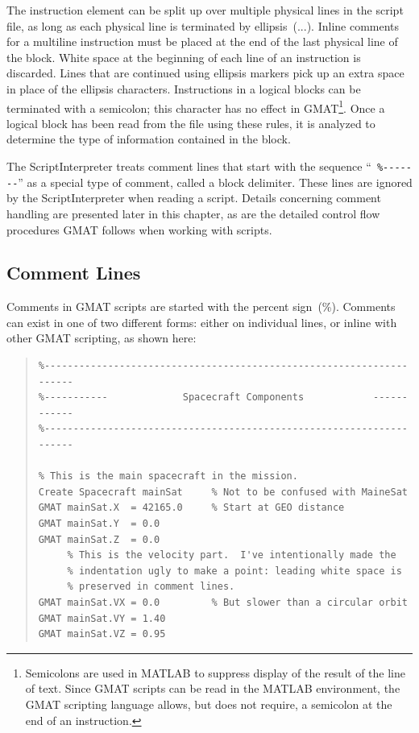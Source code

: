 The instruction element can be split up over multiple physical lines in the script file, as long as
each physical line is terminated by ellipsis~(...).  Inline comments for a multiline instruction
must be placed at the end of the last physical line of the block.  White space at the beginning
of each line of an instruction is discarded.  Lines that are continued using ellipsis markers pick
up an extra space in place of the ellipsis characters.  Instructions in a logical blocks can be
terminated with a semicolon; this character has no effect in GMAT\footnote{Semicolons are used in
MATLAB to suppress display of the result of the line of text.  Since GMAT scripts can be read in the
MATLAB environment, the GMAT scripting language allows, but does not require, a semicolon at the end
of an instruction.}.  Once a logical block has been read from the file using these rules, it is
analyzed to determine the type of information contained in the block.

The ScriptInterpreter treats comment lines that start with the sequence ``\texttt{
\%\nobreakdash-\nobreakdash-\nobreakdash-\nobreakdash-\nobreakdash-\nobreakdash-\nobreakdash-}''  as
a special type of comment, called a block delimiter. These lines are ignored by the
ScriptInterpreter when reading a script.  Details concerning comment handling are presented later
in this chapter, as are the detailed control flow procedures GMAT follows when working with scripts.

\subsection{\label{section:ScriptComments}Comment Lines}

Comments in GMAT scripts are started with the percent sign~(\%).  Comments can exist in one of two
different forms: either on individual lines, or inline with other GMAT scripting, as shown here:

\begin{quote}
\linenumbers[1]
\begin{verbatim}
%---------------------------------------------------------------------
%-----------             Spacecraft Components            ------------
%---------------------------------------------------------------------

% This is the main spacecraft in the mission.
Create Spacecraft mainSat     % Not to be confused with MaineSat
GMAT mainSat.X  = 42165.0     % Start at GEO distance
GMAT mainSat.Y  = 0.0
GMAT mainSat.Z  = 0.0
     % This is the velocity part.  I've intentionally made the
     % indentation ugly to make a point: leading white space is
     % preserved in comment lines.
GMAT mainSat.VX = 0.0         % But slower than a circular orbit
GMAT mainSat.VY = 1.40
GMAT mainSat.VZ = 0.95
\end{verbatim}
\nolinenumbers
\end{quote}

